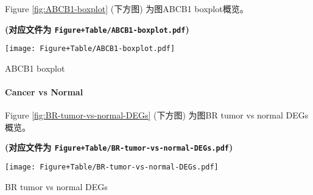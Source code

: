 \documentclass[
]{article}
\begin{document}
\begin{center}\vspace{1.5cm}\end{center}

\begin{center}\vspace{1.5cm}\end{center}

Figure \ref{fig:ABCB1-boxplot} (下方图) 为图ABCB1 boxplot概览。

\textbf{(对应文件为 \texttt{Figure+Table/ABCB1-boxplot.pdf})}

\def\@captype{figure}
\begin{center}
\texttt{[image: Figure+Table/ABCB1-boxplot.pdf]}
\caption{ABCB1 boxplot}\label{fig:ABCB1-boxplot}
\end{center}

\begin{center}\vspace{1.5cm}\end{center}

\hypertarget{cancer-vs-normal}{%
\paragraph{Cancer vs Normal}\label{cancer-vs-normal}}

\begin{center}\vspace{1.5cm}\end{center}

Figure \ref{fig:BR-tumor-vs-normal-DEGs} (下方图) 为图BR tumor vs normal DEGs概览。

\textbf{(对应文件为 \texttt{Figure+Table/BR-tumor-vs-normal-DEGs.pdf})}

\def\@captype{figure}
\begin{center}
\texttt{[image: Figure+Table/BR-tumor-vs-normal-DEGs.pdf]}
\caption{BR tumor vs normal DEGs}\label{fig:BR-tumor-vs-normal-DEGs}
\end{center}
\end{document}
